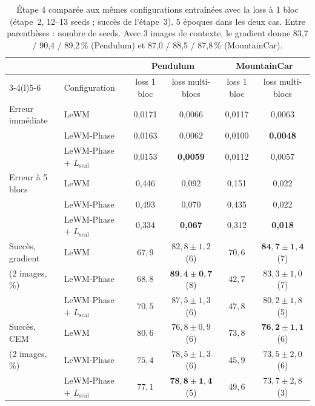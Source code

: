 \documentclass[11pt,a4paper]{article}
\newcommand{\Lscal}{L_{\mathrm{scal}}}
\begin{document}
\begin{table}[htbp]
\centering\small
\begin{tabular}{@{}llcccc@{}}
\toprule
& & \multicolumn{2}{c}{Pendulum} & \multicolumn{2}{c}{MountainCar} \\
\cmidrule(lr){3-4}\cmidrule(l){5-6}
& Configuration & loss 1 bloc & loss multi-blocs & loss 1 bloc & loss multi-blocs \\
\midrule
Erreur immédiate & LeWM            & 0,0171 & 0,0066 & 0,0117 & 0,0063 \\
                 & LeWM-Phase          & 0,0163 & 0,0062 & 0,0100 & \textbf{0,0048} \\
                 & LeWM-Phase + $\Lscal$ & 0,0153 & \textbf{0,0059} & 0,0112 & 0,0057 \\
\midrule
Erreur à 5 blocs & LeWM            & 0,446 & 0,092 & 0,151 & 0,022 \\
                 & LeWM-Phase          & 0,493 & 0,070 & 0,435 & 0,022 \\
                 & LeWM-Phase + $\Lscal$ & 0,334 & \textbf{0,067} & 0,312 & \textbf{0,018} \\
\midrule
Succès, gradient   & LeWM            & $67{,}9$ & $82{,}8 \pm 1{,}2$ (6) & $70{,}6$ & $\mathbf{84{,}7 \pm 1{,}4}$ (7) \\
(2 images, \%)     & LeWM-Phase          & $68{,}8$ & $\mathbf{89{,}4 \pm 0{,}7}$ (8) & $42{,}7$ & $83{,}3 \pm 1{,}0$ (7) \\
                   & LeWM-Phase + $\Lscal$ & $70{,}5$ & $87{,}5 \pm 1{,}3$ (6) & $47{,}8$ & $80{,}2 \pm 1{,}8$ (5) \\
\midrule
Succès, CEM        & LeWM            & $80{,}6$ & $76{,}8 \pm 0{,}9$ (6) & $73{,}8$ & $\mathbf{76{,}2 \pm 1{,}1}$ (6) \\
(2 images, \%)     & LeWM-Phase          & $75{,}4$ & $78{,}5 \pm 1{,}3$ (6) & $45{,}9$ & $73{,}5 \pm 2{,}0$ (6) \\
                   & LeWM-Phase + $\Lscal$ & $77{,}1$ & $\mathbf{78{,}8 \pm 1{,}4}$ (5) & $49{,}6$ & $73{,}7 \pm 2{,}8$ (3) \\
\bottomrule
\end{tabular}
\caption{Étape 4 comparée aux mêmes configurations entraînées avec la loss à 1 bloc
(étape~2, 12--13 seeds ; succès de l'étape~3). 5 époques dans les deux cas. Entre parenthèses :
nombre de seeds. Avec 3 images de contexte, le gradient donne 83,7 / 90,4 / 89,2\,\% (Pendulum)
et 87,0 / 88,5 / 87,8\,\% (MountainCar).}
\label{tab:m9}
\end{table}
\end{document}
